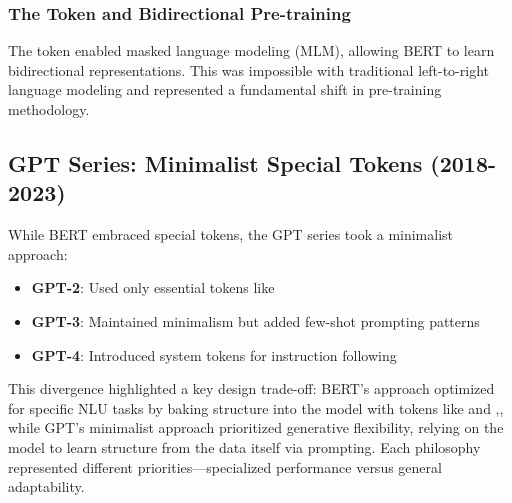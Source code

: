 \subsubsection{The \mask{} Token and Bidirectional Pre-training}
The \mask{} token enabled masked language modeling (MLM), allowing BERT to learn bidirectional representations. This was impossible with traditional left-to-right language modeling and represented a fundamental shift in pre-training methodology.

\subsection{GPT Series: Minimalist Special Tokens (2018-2023)}

While BERT embraced special tokens, the GPT series \citep{radford2019language} took a minimalist approach:

\begin{itemize}
\item \textbf{GPT-2}: Used only essential tokens like 
\item \textbf{GPT-3}: Maintained minimalism but added few-shot prompting patterns
\item \textbf{GPT-4}: Introduced system tokens for instruction following
\end{itemize}

This divergence highlighted a key design trade-off: BERT's approach optimized for specific NLU tasks by baking structure into the model with tokens like \cls{} and \sep{}, while GPT's minimalist approach prioritized generative flexibility, relying on the model to learn structure from the data itself via prompting. Each philosophy represented different priorities---specialized performance versus general adaptability.

